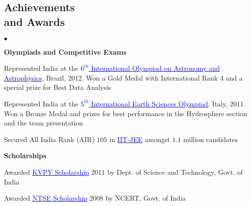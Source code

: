 \documentclass[margin,line]{res}
\newenvironment{list2}{
  \begin{list}{$\bullet$}{%
      \setlength{\itemsep}{0in}
      \setlength{\parsep}{0in} \setlength{\parskip}{0in}
      \setlength{\topsep}{0in} \setlength{\partopsep}{0in} 
      \setlength{\leftmargin}{0.2in}}}{\end{list}}
\begin{document}
\begin{resume}
\section{\sc Achievements \\and Awards}
\begin{list2}
\item[\strut\hspace{0.5cm}\textbf{Olympiads and Competitive Exams}]
\item Represented India at the \href{http://www.ioaa2012.ufrj.br/}{\textcolor{blue} {$6^{th}$ International Olympiad on Astronomy and Astrophysics}}, Brazil, 2012. Won a Gold Medal with International Rank 4 and a special prize for Best Data Analysis
\item Represented India at the \href{http://www.ieso2011.unimore.it/}{\textcolor{blue} {$5^{th}$ International Earth Sciences Olympiad}}, Italy, 2011. Won a Bronze Medal and prizes for best performance in the Hydrosphere section and the team presentation
\item  Secured All India Rank (AIR) $105$ in \href{https://en.wikipedia.org/wiki/Indian_Institute_of_Technology_Joint_Entrance_Examination}{\textcolor{blue}{IIT-JEE}} amongst $1.1$ million candidates
\vspace{0.05in}
\item[\strut\hspace{0.5cm}\textbf{Scholarships}]
\item Awarded \href{http://www.kvpy.iisc.ernet.in/main/index.htm}{\textcolor{blue}{KVPY Scholarship}} $2011$ by Dept. of Science and Technology, Govt. of India
\item Awarded \href{http://www.ncert.nic.in/programmes/talent_exam/index_talent.html}{\textcolor{blue}{NTSE Scholarship}} $2008$ by NCERT, Govt. of India
\end{list2}

\vspace*{-0.13in}


\end{resume}
\end{document}
